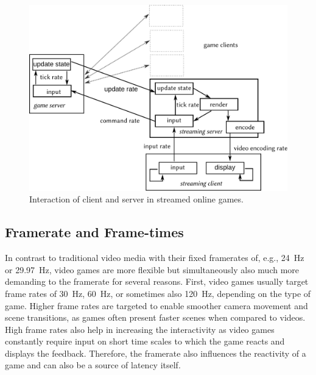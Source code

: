 \begin{figure}[!t]
	\centering
	\includegraphics[width=1.0\columnwidth]{../models/game-tick-rate-streamed.pdf}
	\caption{Interaction of client and server in streamed online games.}
\label{fig:tickrate-streamed}
\end{figure}


\subsection{Framerate and Frame-times}
\label{sec:framerate}

In contrast to traditional video media with their fixed framerates of, e.g., \SI{24}{\hertz} or \SI{29.97}{\hertz}, video games are more flexible but simultaneously also much more demanding to the framerate for several reasons. First, video games usually target frame rates of \SI{30}{\hertz}, \SI{60}{\hertz}, or sometimes also \SI{120}{\hertz}, depending on the type of game. Higher frame rates are targeted to enable smoother camera movement and scene transitions, as games often present faster scenes when compared to videos. High frame rates also help in increasing the interactivity as video games constantly require input on short time scales to which the game reacts and displays the feedback. Therefore, the framerate also influences the reactivity of a game and can also be a source of latency itself.


